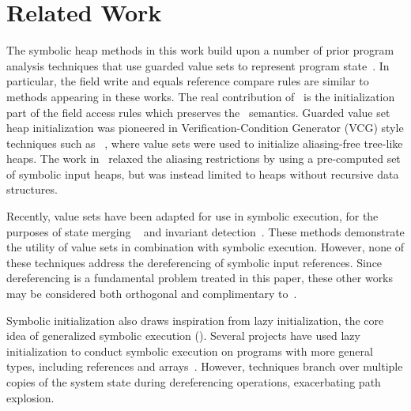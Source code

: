 \section{Related Work}
\label{sec:related}
%
The symbolic heap methods in this work build upon a
number of prior program analysis techniques that use guarded value sets to
represent program
state~\cite{Sen:2014,Torlak:2014,Xie:2005,Dillig:2011,Elkarablieh:2009}. In particular, the field write and equals reference compare rules are similar to methods appearing in these works. The real contribution of \symtxt\ is the initialization part of the field access rules which preserves the \gsetxt\ semantics.
Guarded value set heap initialization was pioneered in Verification-Condition Generator (VCG) style techniques such as ~\cite{Xie:2005}, where value sets were used to 
initialize aliasing-free tree-like heaps. The work in~\cite{Dillig:2011} relaxed the aliasing restrictions by using a pre-computed set of symbolic input heaps, but was instead limited to heaps without recursive data structures. 

Recently, value sets have been adapted for use in symbolic execution, for the purposes of state merging ~\cite{Sen:2014,Torlak:2014} and invariant detection~\cite{Ferrara:2014}. These methods demonstrate the utility of value sets in combination with symbolic execution. However, none of these techniques address the dereferencing of symbolic input references. Since dereferencing is a fundamental problem treated in this paper, these other works may be considered both orthogonal and complimentary to~\symtxt{}.

Symbolic initialization also draws inspiration from lazy initialization, the core idea of generalized symbolic execution (\gsetxt{})\cite{GSE03}. Several projects have used lazy initialization to conduct symbolic execution on programs with more general types,
including references and
arrays~\cite{KiasanKunit,Cadar:2008,Deng:2007,Rosner:2015,Blackshear:2013,Filieri:2015}. However, \gsetxt{} techniques branch over
multiple copies of the system state during dereferencing operations,
exacerbating path explosion.

